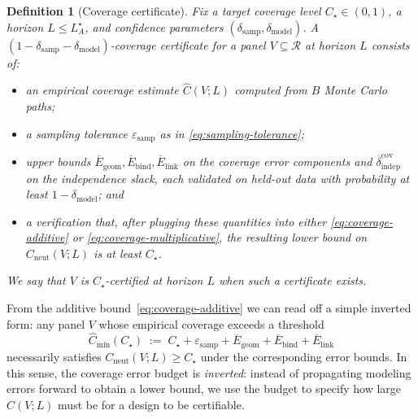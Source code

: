 \documentclass[11pt]{article}
\newtheorem{definition}{Definition}
\begin{document}
\begin{definition}[Coverage certificate]
\label{def:coverage-certificate}
Fix a target coverage level $C_\star \in (0,1)$, a horizon $L \le L_A^\star$, and confidence
parameters $(\delta_{\mathrm{samp}},\delta_{\mathrm{model}})$. A
$(1-\delta_{\mathrm{samp}}-\delta_{\mathrm{model}})$-\emph{coverage certificate} for a panel
$V \subseteq \mathcal{R}$ at horizon $L$ consists of:
\begin{itemize}
\item an empirical coverage estimate $\widehat{C}(V;L)$ computed from $B$ Monte Carlo paths;
\item a sampling tolerance $\varepsilon_{\mathrm{samp}}$ as in \eqref{eq:sampling-tolerance};
\item upper bounds $\overline{E}_{\mathrm{geom}}, \overline{E}_{\mathrm{bind}},
\overline{E}_{\mathrm{link}}$ on the coverage error components and
$\overline{\delta}_{\mathrm{indep}}^{\mathrm{cov}}$ on the independence slack, each validated on
held-out data with probability at least $1-\delta_{\mathrm{model}}$; and
\item a verification that, after plugging these quantities into either
\eqref{eq:coverage-additive} or \eqref{eq:coverage-multiplicative}, the resulting lower bound on
$C_{\mathrm{neut}}(V;L)$ is at least $C_\star$.
\end{itemize}
We say that $V$ is \emph{$C_\star$-certified at horizon $L$} when such a certificate exists.
\end{definition}

From the additive bound~\eqref{eq:coverage-additive} we can read off a simple inverted form: any
panel $V$ whose empirical coverage exceeds a threshold
\begin{equation}
\label{eq:required-empirical-coverage}
\widehat{C}_{\min}(C_\star)
\;:=\;
C_\star
+ \varepsilon_{\mathrm{samp}}
+ \overline{E}_{\mathrm{geom}}
+ \overline{E}_{\mathrm{bind}}
+ \overline{E}_{\mathrm{link}}
\end{equation}
necessarily satisfies $C_{\mathrm{neut}}(V;L) \ge C_\star$ under the corresponding error bounds.
In this sense, the coverage error budget is \emph{inverted}: instead of propagating modeling
errors forward to obtain a lower bound, we use the budget to specify how large
$\widehat{C}(V;L)$ must be for a design to be certifiable.
\end{document}
